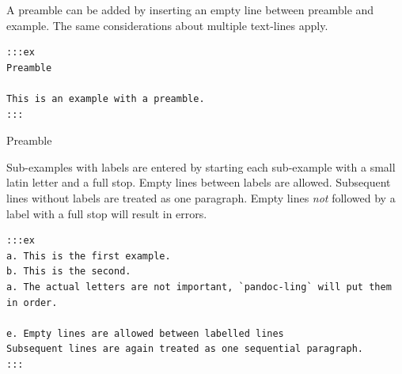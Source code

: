 \documentclass[
]{article}
\begin{document}
\begin{samepage}
\begin{exe} \judgewidth{}
  \label{id}
\end{exe}
\end{samepage}

A preamble can be added by inserting an empty line between preamble and
example. The same considerations about multiple text-lines apply.

\begin{verbatim}
:::ex
Preamble

This is an example with a preamble.
:::
\end{verbatim}

\begin{samepage}
\begin{exe} \judgewidth{}
  \ex Preamble
  \label{ex4.3}
\end{exe}
\end{samepage}

Sub-examples with labels are entered by starting each sub-example with a
small latin letter and a full stop. Empty lines between labels are
allowed. Subsequent lines without labels are treated as one paragraph.
Empty lines \emph{not} followed by a label with a full stop will result
in errors.

\begin{verbatim}
:::ex
a. This is the first example.
b. This is the second.
a. The actual letters are not important, `pandoc-ling` will put them in order.

e. Empty lines are allowed between labelled lines
Subsequent lines are again treated as one sequential paragraph.
:::
\end{verbatim}

\begin{samepage}
\begin{exe} \judgewidth{}
  \ex 
  \begin{xlist}
  \end{xlist}
  \label{ex4.4}
\end{exe}
\end{samepage}
\end{document}
